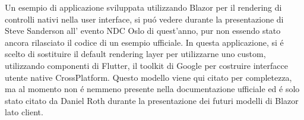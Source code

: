 Un esempio di applicazione sviluppata utilizzando Blazor per il rendering di controlli nativi nella user interface, si pu\'o vedere durante la presentazione di Steve Sanderson all' evento NDC Oslo di quest'anno, pur non essendo stato ancora rilasciato il codice di un esempio ufficiale.\cite{sandersonNDCBlutter}
In questa applicazione, si \'e scelto di sostituire il default rendering layer per utilizzarne uno custom, utilizzando componenti di Flutter, il toolkit di Google per costruire interfacce utente native CrossPlatform.
Questo modello viene qui citato per completezza, ma al momento non \'e nemmeno presente nella documentazione ufficiale ed \'e solo stato citato da Daniel Roth durante la presentazione dei futuri modelli di Blazor lato client.\cite{blazorNative}
\pagebreak